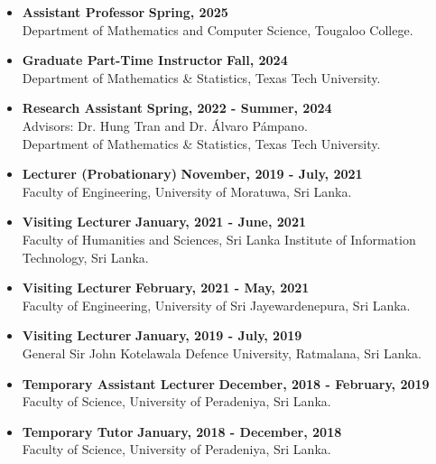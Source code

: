\documentclass[12pt]{book}
\begin{document}
\begin{itemize}

\item \textbf{Assistant Professor} \hfill \textbf{Spring, 2025}\\
Department of Mathematics and Computer Science, Tougaloo College.
	\item \textbf{Graduate Part-Time Instructor} \hfill \textbf{Fall, 2024}\\
Department of Mathematics \& Statistics, Texas Tech University.

\item \textbf{Research Assistant} \hfill \textbf{Spring, 2022 - Summer, 2024} \\
Advisors: Dr. Hung Tran and Dr. \'Alvaro P\'ampano.\\
Department of Mathematics \& Statistics, Texas Tech University.

\item \textbf{Lecturer (Probationary)} \hfill \textbf{November, 2019 - July, 2021}\\
Faculty of Engineering, University of Moratuwa, Sri Lanka.

\item \textbf{Visiting Lecturer} \hfill \textbf{January, 2021 - June, 2021}\\
Faculty of Humanities and Sciences, Sri Lanka Institute of Information Technology, Sri Lanka.

\item \textbf{Visiting Lecturer} \hfill \textbf{February, 2021 - May, 2021}\\
Faculty of Engineering, University of Sri Jayewardenepura, Sri Lanka.

\item \textbf{Visiting Lecturer} \hfill \textbf{January, 2019 - July, 2019}\\
General Sir John Kotelawala Defence University, Ratmalana, Sri Lanka.

\item \textbf{Temporary Assistant Lecturer} \hfill \textbf{December, 2018 - February, 2019}\\
Faculty of Science, University of Peradeniya, Sri Lanka.

\item \textbf{Temporary Tutor} \hfill \textbf{January, 2018 - December, 2018}\\
Faculty of Science, University of Peradeniya, Sri Lanka.
\end{itemize}
\end{document}
